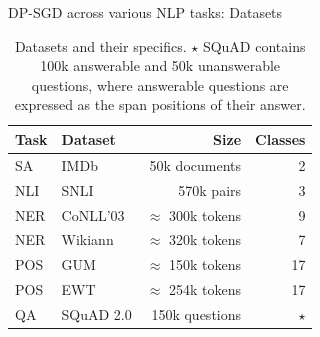 \documentclass[12pt,aspectratio=169,handout]{beamer}
\begin{document}
\begin{frame}{DP-SGD across various NLP tasks: Datasets}



\begin{table}
\scriptsize
\begin{tabular}{llrr}
\toprule
{Task} & {Dataset} & {Size} & {Classes}\\ 
\hline
SA & IMDb & 50k documents & 2\\
NLI&  SNLI &  570k pairs &  3\vspace{0.7em}\\
NER &  CoNLL'03 &  $\approx$ 300k tokens &  9 \\
NER & Wikiann & $\approx$ 320k tokens & 7\\
POS & GUM & $\approx$ 150k tokens  & 17 \\
POS & EWT & $\approx$ 254k tokens & 17\vspace{0.7em}\\
QA&  SQuAD 2.0 & 150k questions  &  $\star$ \\
\bottomrule
\end{tabular}
\caption{Datasets and their specifics. $\star$ SQuAD contains 100k answerable and 50k unanswerable questions, where answerable questions are expressed as the span positions of their answer.}
\label{tab:dataset}
\end{table}




\end{frame}
\end{document}

